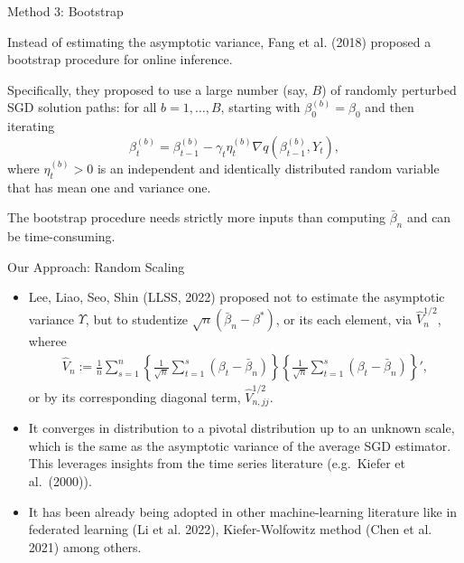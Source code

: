 \documentclass[beamer, t]{beamer}
\newcommand{\tcb}{\textcolor{blue}}
\begin{document}
\begin{frame}{Method 3: Bootstrap}


Instead of estimating the asymptotic variance, Fang et al. (2018) proposed a  bootstrap procedure  for  online inference.

\bigskip
Specifically, they proposed to use a large number (say, $B$) of randomly perturbed
SGD solution paths: for all $b = 1, \ldots, B$, starting with $\beta_0^{(b)} = \beta_0$ and then iterating
\begin{equation*}
\beta_{t}^{(b)}=\beta_{t-1}^{(b)}-\gamma_{t} \eta_t^{(b)} \nabla q\left(\beta_{t-1}^{(b)},Y_{t}\right),
\label{eq:SGD1:bt}
\end{equation*}
where $\eta_t^{(b)} > 0$ is an independent and identically distributed random variable that has mean one and variance one.


\bigskip
The bootstrap procedure needs strictly more inputs than computing $\bar{\beta}_{n}$
and can be time-consuming.

\end{frame}



\begin{frame}{Our Approach: Random Scaling}

\begin{itemize}
	\item Lee, Liao, Seo, Shin (LLSS, 2022) proposed not to estimate the asymptotic variance $\Upsilon$,  but to studentize   $\sqrt{n}\left(\bar{\beta}_{n}-\beta^{*}\right)$, or its each element, via $ \widehat{V}_{n}^{1/2} $, wheree
	\begin{align*}\label{def:random-scaling}
	\widehat{V}_{n} := \frac{1}{n}\sum_{s=1}^{n}
	\left\{ \frac{1}{\sqrt{n}} \sum_{t=1}^{s} \left( \beta_{t}-\bar{\beta}_{n} \right) \right \}
	\left\{ \frac{1}{\sqrt{n}} \sum_{t=1}^{s} \left( \beta_{t}-\bar{\beta}_{n} \right) \right \}',
	\end{align*}
	or by its corresponding diagonal term, $ \widehat{V}_{n,jj}^{1/2}  $.
	
	\item
	It converges in distribution to a pivotal distribution up to an unknown scale, which is the same as the asymptotic variance of the average SGD estimator. 
	This leverages insights from the time series literature (e.g.~Kiefer et al.~(2000)).
	
	\item It has been already being adopted in other machine-learning literature like in federated learning (Li et al. 2022), Kiefer-Wolfowitz method (Chen et al. 2021) among others.
	
	
	
	
\end{itemize}





\end{frame}
\end{document}
